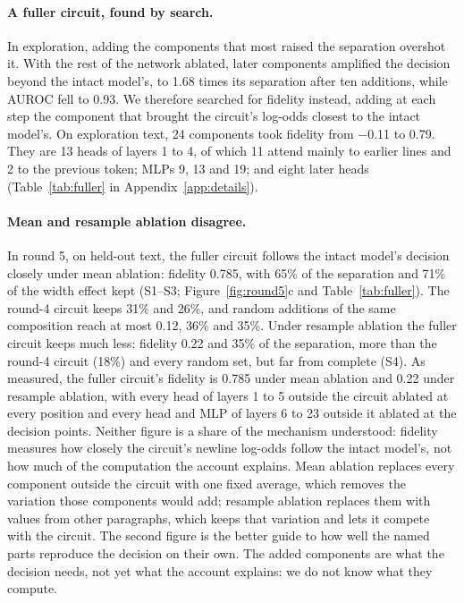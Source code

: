 \documentclass[11pt,a4paper]{article}
\begin{document}
\paragraph{A fuller circuit, found by search.}
In exploration, adding the components that most raised the separation overshot it. With the rest of the network ablated, later components amplified the decision beyond the intact model's, to 1.68 times its separation after ten additions, while AUROC fell to 0.93. We therefore searched for fidelity instead, adding at each step the component that brought the circuit's log-odds closest to the intact model's. On exploration text, 24 components took fidelity from $-$0.11 to 0.79. They are 13 heads of layers 1 to 4, of which 11 attend mainly to earlier lines and 2 to the previous token; MLPs 9, 13 and 19; and eight later heads (Table~\ref{tab:fuller} in Appendix~\ref{app:details}).

\paragraph{Mean and resample ablation disagree.}
In round 5, on held-out text, the fuller circuit follows the intact model's decision closely under mean ablation: fidelity 0.785, with 65\% of the separation and 71\% of the width effect kept (S1--S3; Figure~\ref{fig:round5}c and Table~\ref{tab:fuller}). The round-4 circuit keeps 31\% and 26\%, and random additions of the same composition reach at most 0.12, 36\% and 35\%. Under resample ablation the fuller circuit keeps much less: fidelity 0.22 and 35\% of the separation, more than the round-4 circuit (18\%) and every random set, but far from complete (S4). As measured, the fuller circuit's fidelity is 0.785 under mean ablation and 0.22 under resample ablation, with every head of layers 1 to 5 outside the circuit ablated at every position and every head and MLP of layers 6 to 23 outside it ablated at the decision points. Neither figure is a share of the mechanism understood: fidelity measures how closely the circuit's newline log-odds follow the intact model's, not how much of the computation the account explains. Mean ablation replaces every component outside the circuit with one fixed average, which removes the variation those components would add; resample ablation replaces them with values from other paragraphs, which keeps that variation and lets it compete with the circuit. The second figure is the better guide to how well the named parts reproduce the decision on their own. The added components are what the decision needs, not yet what the account explains: we do not know what they compute.
\end{document}
